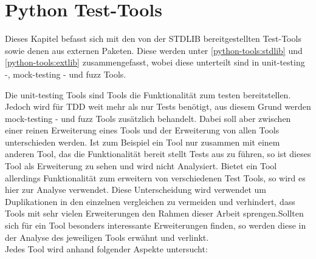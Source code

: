 \section{Python Test-Tools}\label{python-tools}

Dieses Kapitel befasst sich mit den von der STDLIB bereitgestellten Test-Tools
sowie denen aus externen Paketen.
Diese werden unter \ref{python-tools:stdlib} und \ref{python-tools:extlib}
zusammengefasst, wobei diese unterteilt sind in unit-testing -,
\gls{mock}-testing - und \gls{fuzz} Tools.

Die unit-testing Tools sind Tools die Funktionalität zum testen bereitstellen.
Jedoch wird für TDD weit mehr als nur Tests benötigt, aus diesem Grund werden
\gls{mock}-testing - und \gls{fuzz} Tools zusätzlich behandelt. Dabei soll aber
zwischen einer reinen Erweiterung eines Tools und der Erweiterung von allen Tools
unterschieden werden.
Ist zum Beispiel ein Tool nur zusammen mit einem anderen Tool, das die
Funktionalität bereit stellt Tests aus zu führen, so ist dieses Tool als
Erweiterung zu sehen und wird nicht Analysiert. Bietet ein Tool allerdings
Funktionalität zum erweitern von verschiedenen Test Tools, so wird es 
hier zur Analyse verwendet. Diese Unterscheidung wird verwendet um Duplikationen
in den einzelnen vergleichen zu vermeiden und verhindert, dass Tools mit sehr
vielen Erweiterungen den Rahmen dieser Arbeit sprengen.Sollten sich für ein Tool
besonders interessante Erweiterungen finden, so werden diese in der Analyse des
jeweiligen Tools erwähnt und verlinkt.
\newline
\\
Jedes Tool wird anhand folgender Aspekte untersucht:
